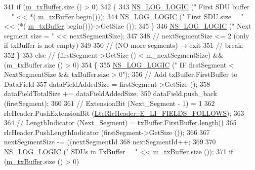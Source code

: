 \begin{DoxyCode}
341           \textcolor{keywordflow}{if} (\hyperlink{classns3_1_1LteRlcUmLowLat_aaeef0eed7788f26d7564a84a0c546f74}{m\_txBuffer}.size () > 0)
342             \{
343               \hyperlink{group__logging_ga88acd260151caf2db9c0fc84997f45ce}{NS\_LOG\_LOGIC} (\textcolor{stringliteral}{"        First SDU buffer  = "} << *(
      \hyperlink{classns3_1_1LteRlcUmLowLat_aaeef0eed7788f26d7564a84a0c546f74}{m\_txBuffer}.begin()));
344               \hyperlink{group__logging_ga88acd260151caf2db9c0fc84997f45ce}{NS\_LOG\_LOGIC} (\textcolor{stringliteral}{"        First SDU size    = "} << (*(
      \hyperlink{classns3_1_1LteRlcUmLowLat_aaeef0eed7788f26d7564a84a0c546f74}{m\_txBuffer}.begin()))->GetSize ());
345             \}
346           \hyperlink{group__logging_ga88acd260151caf2db9c0fc84997f45ce}{NS\_LOG\_LOGIC} (\textcolor{stringliteral}{"        Next segment size = "} << nextSegmentSize);
347 
348           \textcolor{comment}{// nextSegmentSize <= 2 (only if txBuffer is not empty)}
349 
350           \textcolor{comment}{// (NO more segments) → exit}
351           \textcolor{comment}{// break;}
352         \}
353       \textcolor{keywordflow}{else} \textcolor{comment}{// (firstSegment->GetSize () < m\_nextSegmentSize) && (m\_txBuffer.size () > 0)}
354         \{
355           \hyperlink{group__logging_ga88acd260151caf2db9c0fc84997f45ce}{NS\_LOG\_LOGIC} (\textcolor{stringliteral}{"    IF firstSegment < NextSegmentSize && txBuffer.size > 0"});
356           \textcolor{comment}{// Add txBuffer.FirstBuffer to DataField}
357           dataFieldAddedSize = firstSegment->GetSize ();
358           dataFieldTotalSize += dataFieldAddedSize;
359           dataField.push\_back (firstSegment);
360 
361           \textcolor{comment}{// ExtensionBit (Next\_Segment - 1) = 1}
362           rlcHeader.PushExtensionBit (\hyperlink{classns3_1_1LteRlcHeader_a48248337dcddd6c1f6f79b75b898266aac938d14a69d34c1fbea6822591cfe9de}{LteRlcHeader::E\_LI\_FIELDS\_FOLLOWS});
363 
364           \textcolor{comment}{// LengthIndicator (Next\_Segment)  = txBuffer.FirstBuffer.length()}
365           rlcHeader.PushLengthIndicator (firstSegment->GetSize ());
366 
367           nextSegmentSize -= ((nextSegmentId %
368           nextSegmentId++;
369 
370           \hyperlink{group__logging_ga88acd260151caf2db9c0fc84997f45ce}{NS\_LOG\_LOGIC} (\textcolor{stringliteral}{"        SDUs in TxBuffer  = "} << \hyperlink{classns3_1_1LteRlcUmLowLat_aaeef0eed7788f26d7564a84a0c546f74}{m\_txBuffer}.size ());
371           \textcolor{keywordflow}{if} (\hyperlink{classns3_1_1LteRlcUmLowLat_aaeef0eed7788f26d7564a84a0c546f74}{m\_txBuffer}.size () > 0)

\end{DoxyCode}
